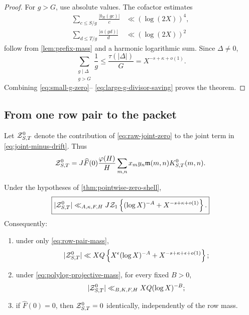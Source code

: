 \begin{proof}
For \(g>G\), use absolute values.  The cofactor estimates
\begin{align}
 \sum_{c\le S/g}\frac{|b_R(gc)|}{c}
 &\ll(\log(2X))^4,
 \label{eq:large-g-c-mass}\\
 \sum_{d\le T/g}\frac{|a(gd)|}{d}
 &\ll(\log(2X))^2
 \label{eq:large-g-d-mass}
\end{align}
follow from \cref{lem:prefix-mass} and a harmonic logarithmic sum.
Since \(\Delta\ne0\),
\begin{equation}
 \sum_{\substack{g\mid\Delta\\g>G}}\frac1g
 \le\frac{\tau(|\Delta|)}G
 =X^{-s+\kappa+o(1)}.
 \label{eq:large-g-divisor-saving}
\end{equation}
Combining \eqref{eq:small-g-zero}--
\eqref{eq:large-g-divisor-saving} proves the theorem.
\end{proof}

\subsection{From one row pair to the packet}

Let \(\mathcal Z^0_{S,T}\) denote the contribution of
\eqref{eq:raw-joint-zero} to the joint term in
\eqref{eq:joint-minus-drift}.  Thus
\begin{equation}
 \mathcal Z^0_{S,T}
 =J\widehat F(0)\frac{\varphi(H)}H
 \sum_{m,n}x_my_n\mathfrak m(m,n)K^0_{S,T}(m,n).
 \label{eq:packet-zero-mode}
\end{equation}

\begin{corollary}
\label{cor:mass-sensitive-zero}
Under the hypotheses of \cref{thm:pointwise-zero-shell},
\begin{equation}
 \boxed{
 |\mathcal Z^0_{S,T}|
 \ll_{A,\kappa,F,H}
 J\mathcal Z_1\left\{(\log X)^{-A}
 +X^{-s+\kappa+o(1)}\right\}.}
 \label{eq:mass-sensitive-zero}
\end{equation}
Consequently:
\begin{enumerate}[label=\textup{(\roman*)}]
 \item under only \eqref{eq:row-pair-mass},
 \begin{equation}
  |\mathcal Z^0_{S,T}|
  \ll XQ\left\{X^\epsilon(\log X)^{-A}
  +X^{-s+\kappa+\epsilon+o(1)}\right\};
  \label{eq:soft-mass-zero}
 \end{equation}
 \item under \eqref{eq:polylog-projective-mass}, for every fixed
 \(B>0\),
 \begin{equation}
  |\mathcal Z^0_{S,T}|\ll_{B,K,F,H}XQ(\log X)^{-B};
  \label{eq:polylog-mass-zero}
 \end{equation}
 \item if \(\widehat F(0)=0\), then \(\mathcal Z^0_{S,T}=0\) identically,
 independently of the row mass.
\end{enumerate}
\end{corollary}

